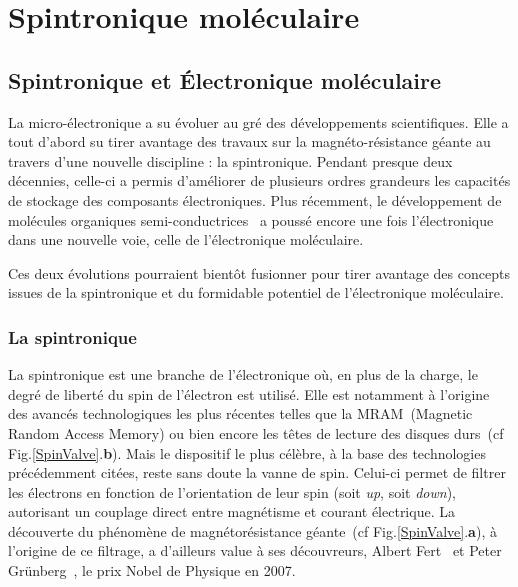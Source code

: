 \chapter{Spintronique moléculaire}

\section{Spintronique et Électronique moléculaire}
La micro-électronique a su évoluer au gré des développements scientifiques. Elle a tout d'abord su tirer avantage des travaux sur la magnéto-résistance géante au travers d'une nouvelle discipline : la spintronique. Pendant presque deux décennies, celle-ci a permis d'améliorer de plusieurs ordres grandeurs les capacités de stockage des composants électroniques. Plus récemment, le développement de molécules organiques semi-conductrices~\cite{Tsumura1986,Horowitz1990,Lin1997} a poussé encore une fois l'électronique dans une nouvelle voie, celle de l'électronique moléculaire.

Ces deux évolutions pourraient bientôt fusionner pour tirer avantage des concepts issues de la spintronique et du formidable potentiel de l'électronique moléculaire.

\subsection{La spintronique}
La spintronique est une branche de l'électronique où, en plus de la charge, le degré de liberté du spin de l'électron est utilisé. Elle est notamment à l'origine des avancés technologiques les plus récentes telles que la MRAM~(Magnetic Random Access Memory) ou bien encore les têtes de lecture des disques durs~(cf Fig.\ref{SpinValve}.\textbf{b}). Mais le dispositif le plus célèbre, à la base des technologies précédemment citées, reste sans doute la vanne de spin. Celui-ci permet de filtrer les électrons en fonction de l'orientation de leur spin (soit \textit{up}, soit \textit{down}), autorisant un couplage direct entre magnétisme et courant électrique. La découverte du phénomène de magnétorésistance géante~(cf Fig.\ref{SpinValve}.\textbf{a}), à l'origine de ce filtrage, a d'ailleurs value à ses découvreurs, Albert Fert~\cite{Baibich1988} et Peter Grünberg~\cite{Gruenberg1986}, le prix Nobel de Physique en 2007.


